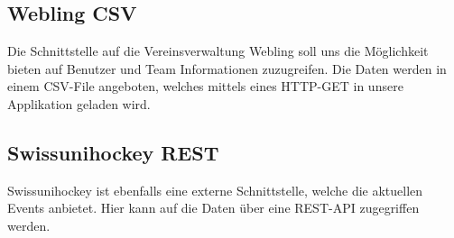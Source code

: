 		\subsection{Webling CSV}
		Die Schnittstelle auf die Vereinsverwaltung Webling soll uns die Möglichkeit bieten auf Benutzer und Team Informationen zuzugreifen. Die Daten werden in einem CSV-File angeboten, welches mittels eines HTTP-GET in unsere Applikation geladen wird.

		\subsection{Swissunihockey REST}
		Swissunihockey ist ebenfalls eine externe Schnittstelle, welche die aktuellen Events anbietet. Hier kann auf die Daten über eine REST-API zugegriffen werden.